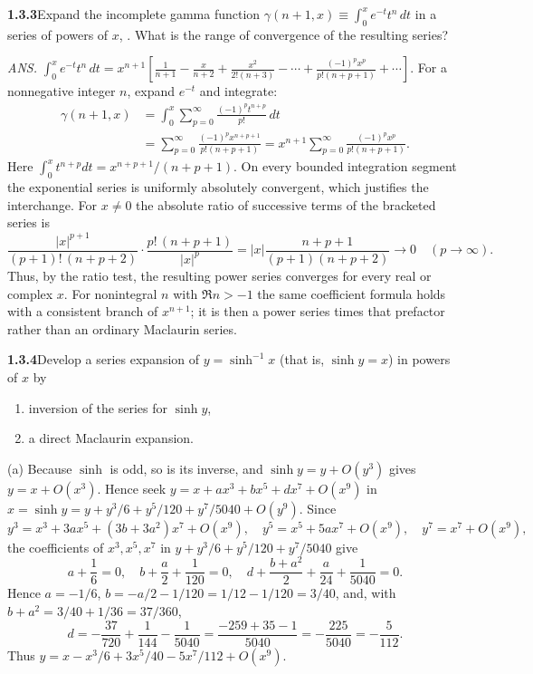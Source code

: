 \par\bigskip
\noindent\textbf{1.3.3}\quad Expand the incomplete gamma function
$\gamma(n+1,x)\equiv\int_{0}^{x}e^{-t}t^{n}\,dt$ in a series of powers of $x$, .
What is the range of convergence of the resulting series?
\par\nobreak\hfill\emph{ANS.}\enspace
$\displaystyle\int_{0}^{x}e^{-t}t^{n}\,dt
=x^{n+1}\left[\frac{1}{n+1}-\frac{x}{n+2}+\frac{x^{2}}{2!(n+3)}
-\cdots+\frac{(-1)^{p}x^{p}}{p!(n+p+1)}+\cdots\right].$
\solution
For a nonnegative integer $n$, expand $e^{-t}$ and integrate:
\[
 \begin{aligned}
 \gamma(n+1,x)
 &=\int_0^x\sum_{p=0}^\infty\frac{(-1)^pt^{n+p}}{p!}\,dt\\
 &=\sum_{p=0}^\infty\frac{(-1)^p x^{n+p+1}}{p!(n+p+1)}
 =x^{n+1}\sum_{p=0}^\infty\frac{(-1)^p x^p}{p!(n+p+1)}.
 \end{aligned}
\]
Here $\int_0^xt^{n+p}dt=x^{n+p+1}/(n+p+1)$.
On every bounded integration segment the exponential series is uniformly
absolutely convergent, which justifies the interchange.
For $x\ne0$ the absolute ratio of successive terms of the bracketed series is
\[
 \frac{|x|^{p+1}}{(p+1)!\,(n+p+2)}\cdot\frac{p!\,(n+p+1)}{|x|^p}
 =|x|\frac{n+p+1}{(p+1)(n+p+2)}\longrightarrow0
 \quad(p\to\infty).
\]
Thus, by the ratio test, the resulting power series converges for every
real or complex $x$. For nonintegral $n$ with $\Re n>-1$ the same coefficient formula
holds with a consistent branch of $x^{n+1}$; it is then a power series
times that prefactor rather than an ordinary Maclaurin series.


\par\bigskip
\noindent\textbf{1.3.4}\quad Develop a series expansion of $y=\sinh^{-1}x$
(that is, $\sinh y=x$) in powers of $x$ by
\begin{enumerate}
\item[(a)] inversion of the series for $\sinh y$,
\item[(b)] a direct Maclaurin expansion.
\end{enumerate}
\solution
(a) Because $\sinh$ is odd, so is its inverse, and $\sinh y=y+O(y^3)$
gives $y=x+O(x^3)$. Hence seek $y=x+a x^3+b x^5+d x^7+O(x^9)$ in
$x=\sinh y=y+y^3/6+y^5/120+y^7/5040+O(y^9)$.
Since
\[
 y^3=x^3+3a x^5+(3b+3a^2)x^7+O(x^9),\quad
 y^5=x^5+5a x^7+O(x^9),\quad y^7=x^7+O(x^9),
\]
the coefficients of $x^3,x^5,x^7$ in $y+y^3/6+y^5/120+y^7/5040$ give
\[
 a+\frac16=0,\quad b+\frac a2+\frac1{120}=0,\quad
 d+\frac{b+a^2}2+\frac a{24}+\frac1{5040}=0.
\]
Hence $a=-1/6$, $b=-a/2-1/120=1/12-1/120=3/40$, and, with
$b+a^2=3/40+1/36=37/360$,
\[
 d=-\frac{37}{720}+\frac1{144}-\frac1{5040}
  =\frac{-259+35-1}{5040}=-\frac{225}{5040}=-\frac5{112}.
\]
Thus $y=x-x^3/6+3x^5/40-5x^7/112+O(x^9)$.

